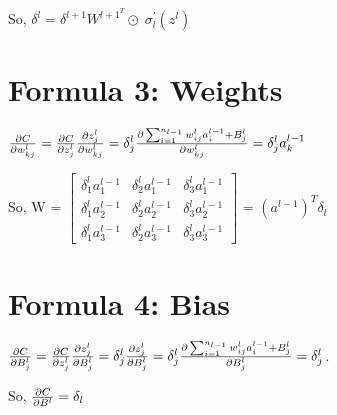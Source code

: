 \documentclass{article}
\begin{document}
So, $\delta^l = \delta^{l+1} W^{{l+1}^T} \odot \; \sigma^\prime_l(z^l)$

\section*{Formula 3: Weights}
$\pdv{C}{w^l_{kj}} = \pdv{C}{z_j^l} \pdv{z_j^l}{w^l_{kj}} = \delta_j^l \pdv{\sum_{i = 1}^{n_{l-1}} w^l_{ij}a^{l-1}_i + B_j^l}{w^l_{kj}} = \delta_j^l a^{l-1}_k$


\begingroup
\renewcommand*{\arraystretch}{1.5}
So, W = $\begin{bmatrix}
    \delta_1^l a_1^{l-1} & \delta_2^l a_1^{l-1} & \delta_3^l a_1^{l-1} \\
    \delta_1^l a_2^{l-1} & \delta_2^l a_2^{l-1} & \delta_3^l a_2^{l-1} \\
    \delta_1^l a_3^{l-1} & \delta_2^l a_3^{l-1} & \delta_3^l a_3^{l-1}
\end{bmatrix}$ = $(a^{l-1})^T \delta_l$
\endgroup

\section*{Formula 4: Bias}
$\pdv{C}{B_j^l} = \pdv{C}{z_j^l} \pdv{z_j^l}{B_j^l} = \delta^l_j \pdv{z_j^l}{B_j^l} = \delta^l_j \pdv{\sum_{i = 1}^{n_{l-1}} w^l_{ij}a^{l-1}_i + B_j^l}{B_j^l} = \delta^l_j$. 

So, $\pdv{C}{B^l} = \delta_l$
\end{document}
